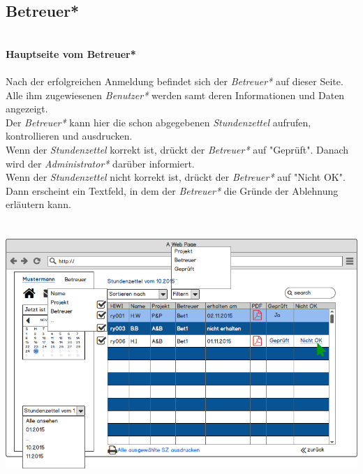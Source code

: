 \subsection{Betreuer*}
\textbf{\\Hauptseite vom Betreuer*}\\
\\
Nach der erfolgreichen Anmeldung befindet sich der \emph{Betreuer*} auf dieser Seite.\\
Alle ihm zugewiesenen \emph{Benutzer*} werden samt deren Informationen und Daten angezeigt.\\
Der \emph{Betreuer*} kann hier die schon abgegebenen \emph{Stundenzettel} aufrufen, kontrollieren und ausdrucken.\\
Wenn der \emph{Stundenzettel} korrekt ist, drückt der \emph{Betreuer*} auf "Geprüft". Danach wird der \emph{Administrator*} darüber informiert.\\
Wenn der \emph{Stundenzettel} nicht korrekt ist, drückt der \emph{Betreuer*} auf "Nicht OK". Dann erscheint ein Textfeld, in dem der \emph{Betreuer*} die Gründe der Ablehnung erläutern kann.\\
\\
\\
\includegraphics[width=\linewidth]{UI/Betreuer/Hauptseite.png}

